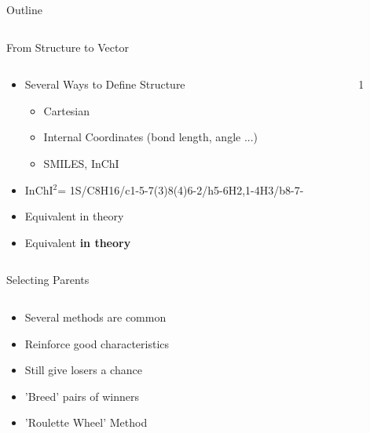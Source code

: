 \documentclass[10pt]{beamer}
\begin{document}
{{{\begin{frame}{Outline}
\begin{columns}[c]
\begin{column}{.48\textwidth}
		\end{column}
		\hfill
		\begin{column}{0.48\textwidth}

		\end{column}	
	\end{columns}
\end{frame}
}

{%
\begin{frame}{From Structure to Vector}
	\begin{columns}[c] %
		\begin{column}{.48\textwidth}
			\begin{itemize}
				\item<1-> {Several Ways to Define Structure
					\begin{itemize}
						\item[] {Cartesian}
						\item[] {Internal Coordinates (bond length, angle ...)}
						\item[] {SMILES, InChI}
					\end{itemize}
				}
				\item<2-> {InChI$^2$= 1S/C8H16/c1-5-7(3)8(4)6-2/h5-6H2,1-4H3/b8-7-}
				\item<only@3> {Equivalent in theory}
				\item<only@4> {Equivalent \alert{\textbf{in theory}}}
			\end{itemize}			
		\end{column}
		\hfill
		\begin{column}{0.48\textwidth}
			1
		\end{column}	
	\end{columns}
\end{frame}
}


\begin{frame}{Selecting Parents}
	\begin{columns}[c] %
		\begin{column}{.48\textwidth}
			\begin{itemize}[<+->]
				\item {Several methods are common}
				\item {Reinforce good characteristics}
				\item {Still give losers a chance}
				\item {'Breed' pairs of winners}
				\item {'Roulette Wheel' Method}
			\end{itemize}				
		\end{column}
		\hfill
		\begin{column}{0.48\textwidth}


\end{column}
\end{columns}
\end{frame}}}
\end{document}
